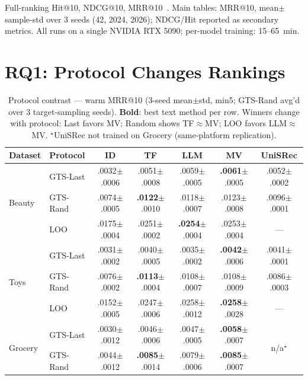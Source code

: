 \documentclass[sigconf,natbib=true,anonymous]{acmart}
\begin{document}
Full-ranking Hit@10, NDCG@10, MRR@10~\cite{krichene2020sampledmetrics}.
Main tables: MRR@10, mean$\pm$sample-std over 3 seeds (42, 2024, 2026); NDCG/Hit reported as secondary metrics.
All runs on a single NVIDIA RTX 5090; per-model training: 15--65~min.

\section{RQ1: Protocol Changes Rankings}
\label{sec:rq1}

\begin{table}[t]
\centering
\caption{%
Protocol contrast --- warm MRR@10 (3-seed mean$\pm$std, min5; GTS-Rand avg'd over 3 target-sampling seeds).
\textbf{Bold}: best text method per row.
Winners change with protocol: Last favors MV; Random shows TF$\approx$MV; LOO favors LLM$\approx$MV.
$^\star$UniSRec not trained on Grocery (same-platform replication).%
}
\label{tab:protocol}
\small
\setlength{\tabcolsep}{2.8pt}
\begin{tabular}{@{}llccccc@{}}
\toprule
Dataset & Protocol & ID & TF & LLM & MV & UniSRec \\
\midrule
\multirow{3}{*}{Beauty}
 & GTS-Last  & .0032\tiny{$\pm$.0006} & .0051\tiny{$\pm$.0008} & .0059\tiny{$\pm$.0005} & \textbf{.0061}\tiny{$\pm$.0005} & .0052\tiny{$\pm$.0002} \\
 & GTS-Rand  & .0074\tiny{$\pm$.0005} & \textbf{.0122}\tiny{$\pm$.0010} & .0118\tiny{$\pm$.0007} & .0123\tiny{$\pm$.0008} & .0096\tiny{$\pm$.0001} \\
 & LOO       & .0175\tiny{$\pm$.0004} & .0251\tiny{$\pm$.0002} & \textbf{.0254}\tiny{$\pm$.0004} & .0253\tiny{$\pm$.0004} & --- \\
\midrule
\multirow{3}{*}{Toys}
 & GTS-Last  & .0031\tiny{$\pm$.0002} & .0040\tiny{$\pm$.0005} & .0035\tiny{$\pm$.0002} & \textbf{.0042}\tiny{$\pm$.0006} & .0041\tiny{$\pm$.0001} \\
 & GTS-Rand  & .0076\tiny{$\pm$.0002} & \textbf{.0113}\tiny{$\pm$.0004} & .0108\tiny{$\pm$.0007} & .0108\tiny{$\pm$.0009} & .0086\tiny{$\pm$.0003} \\
 & LOO       & .0152\tiny{$\pm$.0005} & .0247\tiny{$\pm$.0006} & .0258\tiny{$\pm$.0012} & \textbf{.0258}\tiny{$\pm$.0028} & --- \\
\midrule
\multirow{2}{*}{Grocery}
 & GTS-Last  & .0030\tiny{$\pm$.0012} & .0046\tiny{$\pm$.0006} & .0047\tiny{$\pm$.0005} & \textbf{.0058}\tiny{$\pm$.0007} & \multirow{2}{*}{\textrm{n/a}$^\star$} \\
 & GTS-Rand  & .0044\tiny{$\pm$.0012} & \textbf{.0085}\tiny{$\pm$.0014} & .0079\tiny{$\pm$.0006} & \textbf{.0085}\tiny{$\pm$.0007} & \\
\bottomrule
\end{tabular}
\end{table}
\end{document}
